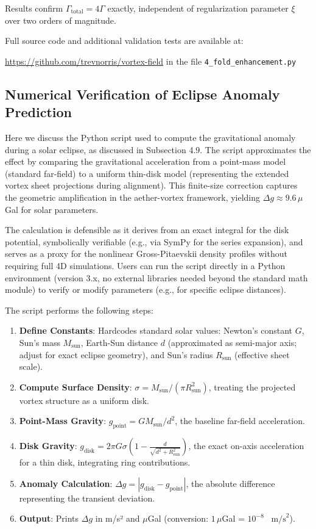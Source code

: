 Results confirm $\Gamma_{\text{total}} = 4\Gamma$ exactly, independent of regularization parameter $\xi$ over two orders of magnitude.

Full source code and additional validation tests are available at:

\noindent\url{https://github.com/trevnorris/vortex-field} in the file \verb|4_fold_enhancement.py|

\subsection{Numerical Verification of Eclipse Anomaly Prediction}

Here we discuss the Python script used to compute the gravitational anomaly during a solar eclipse, as discussed in Subsection 4.9. The script approximates the effect by comparing the gravitational acceleration from a point-mass model (standard far-field) to a uniform thin-disk model (representing the extended vortex sheet projections during alignment). This finite-size correction captures the geometric amplification in the aether-vortex framework, yielding \(\Delta g \approx 9.6 \, \mu\)Gal for solar parameters.

The calculation is defensible as it derives from an exact integral for the disk potential, symbolically verifiable (e.g., via SymPy for the series expansion), and serves as a proxy for the nonlinear Gross-Pitaevskii density profiles without requiring full 4D simulations. Users can run the script directly in a Python environment (version 3.x, no external libraries needed beyond the standard math module) to verify or modify parameters (e.g., for specific eclipse distances).

The script performs the following steps:

\begin{enumerate}
\item \textbf{Define Constants}: Hardcodes standard solar values: Newton's constant \(G\), Sun's mass \(M_{\text{sun}}\), Earth-Sun distance \(d\) (approximated as semi-major axis; adjust for exact eclipse geometry), and Sun's radius \(R_\text{sun}\) (effective sheet scale).
\item \textbf{Compute Surface Density}: \(\sigma = M_\text{sun} / (\pi R_\text{sun}^2)\), treating the projected vortex structure as a uniform disk.
\item \textbf{Point-Mass Gravity}: \(g_{\text{point}} = G M_\text{sun} / d^2\), the baseline far-field acceleration.
\item \textbf{Disk Gravity}: \(g_{\text{disk}} = 2 \pi G \sigma \left(1 - \frac{d}{\sqrt{d^2 + R_\text{sun}^2}}\right)\), the exact on-axis acceleration for a thin disk, integrating ring contributions.
\item \textbf{Anomaly Calculation}: \(\Delta g = |g_{\text{disk}} - g_{\text{point}}|\), the absolute difference representing the transient deviation.
\item \textbf{Output}: Prints \(\Delta g\) in m/s² and \(\mu\)Gal (conversion: \(1 \, \mu\)Gal = $10^{-8}$ \, $\text{m/s}^2$).
\end{enumerate}

